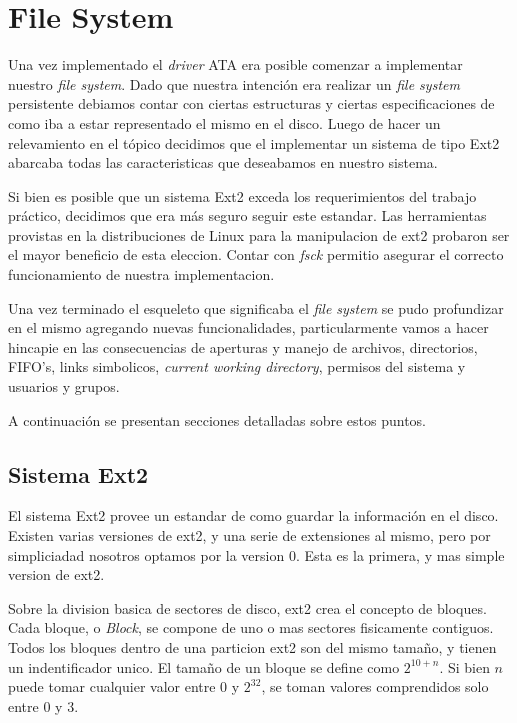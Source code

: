 \documentclass[a4paper,10pt]{article}
\begin{document}
\section{File System}
    
Una vez implementado el \textit{driver} ATA era posible comenzar a implementar nuestro \textit{file system}.
Dado que nuestra intención era realizar un \textit{file system} persistente debiamos contar con ciertas estructuras
y ciertas especificaciones de como iba a estar representado el mismo en el disco. Luego de hacer un relevamiento
en el tópico decidimos que el implementar un sistema de tipo Ext2 abarcaba todas las caracteristicas que deseabamos
en nuestro sistema. 

Si bien es posible que un sistema Ext2 exceda los requerimientos del trabajo práctico, decidimos que era más seguro seguir este estandar. 
Las herramientas provistas en la distribuciones de Linux para la manipulacion de ext2 probaron ser el mayor beneficio de esta eleccion.
Contar con \textit{fsck} permitio asegurar el correcto funcionamiento de nuestra implementacion.

Una vez terminado el esqueleto que significaba el \textit{file system} se pudo profundizar en el mismo agregando
nuevas funcionalidades, particularmente vamos a hacer hincapie en las consecuencias de aperturas y manejo de
archivos, directorios, FIFO's, links simbolicos, \textit{current working
directory}, permisos del sistema y usuarios y grupos.

A continuación se presentan secciones detalladas sobre estos puntos.

\subsection{Sistema Ext2}
El sistema Ext2 provee un estandar de como guardar la información en el disco.
Existen varias versiones de ext2, y una serie de extensiones al mismo, pero por simpliciadad nosotros optamos por la version 0.
Esta es la primera, y mas simple version de ext2.

Sobre la division basica de sectores de disco, ext2 crea el concepto de bloques.
Cada bloque, o \textit{Block}, se compone de uno o mas sectores fisicamente contiguos.
Todos los bloques dentro de una particion ext2 son del mismo tamaño, y tienen un indentificador unico.
El tamaño de un bloque se define como $ 2^{10 + n} $.
Si bien $n$ puede tomar cualquier valor entre 0 y $ 2^{32} $, se toman valores comprendidos solo entre 0 y 3.
\end{document}
